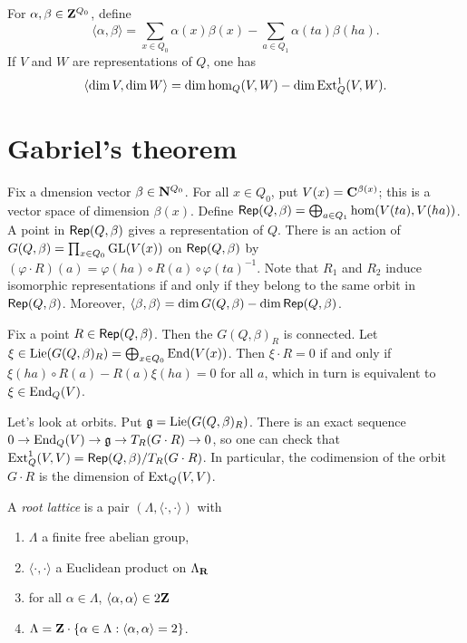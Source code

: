 \documentclass{article}
\begin{document}
For $\alpha,\beta\in \mathbf{Z}^{Q_0}$, define 
\[
  \langle \alpha,\beta\rangle = \sum_{x\in Q_0} \alpha(x) \beta(x) - \sum_{a\in Q_1} \alpha(t a) \beta(h a) .
\]
If $V$ and $W$ are representations of $Q$, one has 
\[
  \langle \dim V,\dim W\rangle = \dim \hom_Q(V,W) - \dim \operatorname{Ext}_Q^1(V,W) .
\]





\section{Gabriel's theorem}

Fix a dmension vector $\beta\in \mathbf{N}^{Q_0}$. For all $x\in Q_0$, put 
$V(x)=\mathbf{C}^{\beta(x)}$; this is a vector space of dimension $\beta(x)$. Define 
$\operatorname{\mathsf{Rep}}(Q,\beta) = \bigoplus_{a\in Q_1} \hom(V(t a),V(h a))$. A point 
in $\operatorname{\mathsf{Rep}}(Q,\beta)$ gives a representation of $Q$. There is an 
action of $G(Q,\beta) = \prod_{x\in Q_0} \operatorname{GL}(V(x))$ on 
$\operatorname{\mathsf{Rep}}(Q,\beta)$ by 
$(\varphi\cdot R)(a) = \varphi(h a)\circ R(a)\circ \varphi(t a)^{-1}$. Note 
that $R_1$ and $R_2$ induce isomorphic representations if and only if they 
belong to the same orbit in $\operatorname{\mathsf{Rep}}(Q,\beta)$. Moreover, 
$\langle \beta,\beta\rangle = \dim G(Q,\beta)-\dim \operatorname{\mathsf{Rep}}(Q,\beta)$. 

Fix a point $R\in \operatorname{\mathsf{Rep}}(Q,\beta)$. Then the 
$G(Q,\beta)_R$ is connected. Let 
$\xi\in \operatorname{Lie}(G(Q,\beta)_R) = \bigoplus_{x\in Q_0} \operatorname{End}(V(x))$. Then 
$\xi\cdot R=0$ if and only if 
$\xi(h a)\circ R(a)-R(a)\xi(h a) = 0$ for all $a$, which in turn is equivalent 
to $\xi\in \operatorname{End}_Q(V)$. 

Let's look at orbits. Put $\mathfrak{g}=\operatorname{Lie}(G(Q,\beta)_R)$. There is an exact 
sequence $0 \to \operatorname{End}_Q(V) \to \mathfrak{g} \to T_R (G\cdot R)\to 0$, so one can check 
that $\operatorname{Ext}_Q^1(V,V) = \operatorname{\mathsf{Rep}}(Q,\beta)/T_R(G\cdot R)$. In 
particular, the codimension of the orbit $G\cdot R$ is the dimension of 
$\operatorname{Ext}_Q(V,V)$. 

\begin{definition}
A \emph{root lattice} is a pair $(\Lambda,\langle\cdot,\cdot\rangle)$ with 
\begin{enumerate}
  \item $\Lambda$ a finite free abelian group, 
  \item $\langle\cdot,\cdot\rangle$ a Euclidean product on $\Lambda_{\mathbf{R}}$ 
  \item for all $\alpha\in \Lambda$, $\langle \alpha,\alpha\rangle\in 2\mathbf{Z}$ 
  \item $\Lambda=\mathbf{Z}\cdot \{\alpha\in \Lambda:\langle \alpha,\alpha\rangle=2\}$. 
\end{enumerate}
\end{definition}
\end{document}
